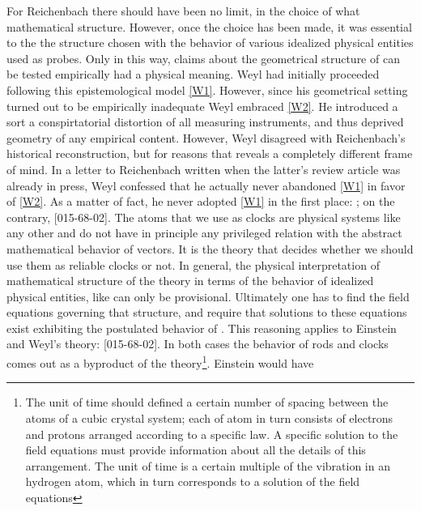 \documentclass[draft]{article}
\newcommand{\WT}{Weyl's theory\xspace}
\begin{document}
For Reichenbach there should have been no limit, in the choice of what mathematical structure. However, once the choice has been made, it was essential to  the the structure chosen with the behavior of various idealized physical entities used as probes. Only in this way, claims about the geometrical structure of \spti can be tested empirically had a physical meaning. Weyl had initially proceeded following this epistemological model \ref{W1}. However, since his geometrical setting turned out to be empirically inadequate Weyl embraced \ref{W2}. He introduced a sort a conspirtatorial distortion of all measuring instruments, and thus deprived geometry of any empirical content. However, Weyl disagreed with Reichenbach's historical reconstruction, but for reasons that reveals a completely different frame of mind. In a letter to Reichenbach written when the latter's review article was already in press, Weyl confessed that he actually never abandoned \ref{W1} in favor of \ref{W2}. As a matter of fact, he never adopted \ref{W1} in the first place: ; on the contrary,  [015-68-02]. The atoms that we use as clocks are physical systems like any other and do not have in principle any privileged relation with the abstract mathematical behavior of vectors. It is the theory that decides whether we should use them as reliable clocks or not. In general, the physical interpretation of mathematical structure of the theory in terms of the behavior of idealized physical entities, like \rac can only be provisional. Ultimately one has to find the field equations governing that structure, and require that solutions to these equations exist exhibiting the postulated behavior of \rac. This reasoning applies to Einstein and \WT:  [015-68-02]. In both cases the behavior of rods and clocks comes out as a byproduct of the theory\footnote{The unit of time should defined a certain number of spacing between the atoms of a cubic crystal system; each of atom in turn consists of electrons and protons arranged according to a specific law. A specific solution to the field equations must provide information about all the details of this arrangement.  The unit of time is a certain multiple of the vibration in an hydrogen atom, which in turn corresponds to a solution of the field equations}. Einstein would have 
\end{document}
